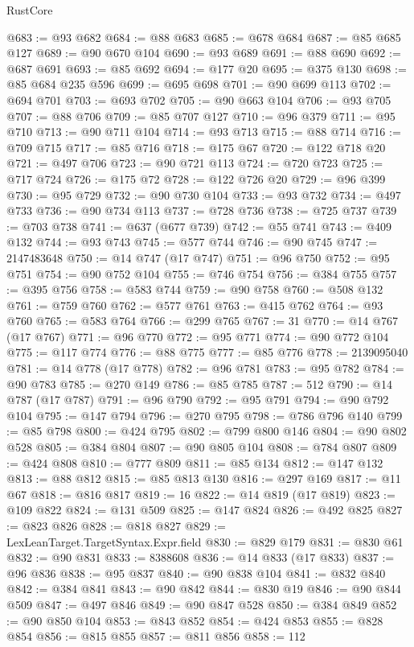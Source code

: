 \begin{lexlean}{RustCore}
\begin{coremodule}
@683 := @93 @682
@684 := @88 @683
@685 := @678 @684
@687 := @85 @685 @127
@689 := @90 @670 @104
@690 := @93 @689
@691 := @88 @690
@692 := @687 @691
@693 := @85 @692
@694 := @177 @20
@695 := @375 @130
@698 := @85 @684 @235 @596
@699 := @695 @698
@701 := @90 @699 @113
@702 := @694 @701
@703 := @693 @702
@705 := @90 @663 @104
@706 := @93 @705
@707 := @88 @706
@709 := @85 @707 @127
@710 := @96 @379
@711 := @95 @710
@713 := @90 @711 @104
@714 := @93 @713
@715 := @88 @714
@716 := @709 @715
@717 := @85 @716
@718 := @175 @67
@720 := @122 @718 @20
@721 := @497 @706
@723 := @90 @721 @113
@724 := @720 @723
@725 := @717 @724
@726 := @175 @72
@728 := @122 @726 @20
@729 := @96 @399
@730 := @95 @729
@732 := @90 @730 @104
@733 := @93 @732
@734 := @497 @733
@736 := @90 @734 @113
@737 := @728 @736
@738 := @725 @737
@739 := @703 @738
@741 := @637 (@677 @739)
@742 := @55 @741
@743 := @409 @132
@744 := @93 @743
@745 := @577 @744
@746 := @90 @745
@747 := 2147483648
@750 := @14 @747 (@17 @747)
@751 := @96 @750
@752 := @95 @751
@754 := @90 @752 @104
@755 := @746 @754
@756 := @384 @755
@757 := @395 @756
@758 := @583 @744
@759 := @90 @758
@760 := @508 @132
@761 := @759 @760
@762 := @577 @761
@763 := @415 @762
@764 := @93 @760
@765 := @583 @764
@766 := @299 @765
@767 := 31
@770 := @14 @767 (@17 @767)
@771 := @96 @770
@772 := @95 @771
@774 := @90 @772 @104
@775 := @117 @774
@776 := @88 @775
@777 := @85 @776
@778 := 2139095040
@781 := @14 @778 (@17 @778)
@782 := @96 @781
@783 := @95 @782
@784 := @90 @783
@785 := @270 @149
@786 := @85 @785
@787 := 512
@790 := @14 @787 (@17 @787)
@791 := @96 @790
@792 := @95 @791
@794 := @90 @792 @104
@795 := @147 @794
@796 := @270 @795
@798 := @786 @796 @140
@799 := @85 @798
@800 := @424 @795
@802 := @799 @800 @146
@804 := @90 @802 @528
@805 := @384 @804
@807 := @90 @805 @104
@808 := @784 @807
@809 := @424 @808
@810 := @777 @809
@811 := @85 @134
@812 := @147 @132
@813 := @88 @812
@815 := @85 @813 @130
@816 := @297 @169
@817 := @11 @67
@818 := @816 @817
@819 := 16
@822 := @14 @819 (@17 @819)
@823 := @109 @822
@824 := @131 @509
@825 := @147 @824
@826 := @492 @825
@827 := @823 @826
@828 := @818 @827
@829 := LexLeanTarget.TargetSyntax.Expr.field
@830 := @829 @179
@831 := @830 @61
@832 := @90 @831
@833 := 8388608
@836 := @14 @833 (@17 @833)
@837 := @96 @836
@838 := @95 @837
@840 := @90 @838 @104
@841 := @832 @840
@842 := @384 @841
@843 := @90 @842
@844 := @830 @19
@846 := @90 @844 @509
@847 := @497 @846
@849 := @90 @847 @528
@850 := @384 @849
@852 := @90 @850 @104
@853 := @843 @852
@854 := @424 @853
@855 := @828 @854
@856 := @815 @855
@857 := @811 @856
@858 := 112

\end{coremodule}
\end{lexlean}
